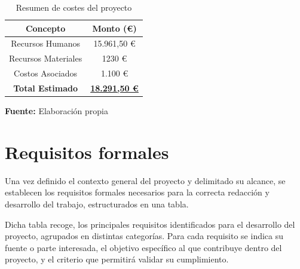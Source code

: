\documentclass[a4paper, 11pt]{article}
\begin{document}
\begin{table}[H]
\caption{Resumen de costes del proyecto}
\centering
\renewcommand{\arraystretch}{1.5}
\begin{tabular}{|c|c|}
\hline
\textbf{Concepto} & \textbf{Monto (€)} \\ \hline
Recursos Humanos & 15.961,50 € \\ \hline
Recursos Materiales & 1230 € \\ \hline
Costos Asociados & 1.100 € \\ \hline
\textbf{Total Estimado} & \underline{\textbf{18.291,50 €}} \\ \hline
\end{tabular}
\begin{flushleft}\centering
    \footnotesize \textbf{Fuente:} Elaboración propia
\end{flushleft}   
\label{tab:resumen_costes}
\end{table}



\clearpage
\thispagestyle{nohead}












\section{Requisitos formales}
\par\vspace{0.5cm}
Una vez definido el contexto general del proyecto y delimitado su alcance, se establecen los requisitos formales necesarios para la correcta redacción y desarrollo del trabajo, estructurados en una tabla.
\par\vspace{0.5cm}

Dicha tabla recoge, los principales requisitos identificados para el desarrollo del proyecto, agrupados en distintas categorías. Para cada requisito se indica su fuente 
o parte interesada, el objetivo específico al que contribuye dentro del proyecto, y el criterio que permitirá validar su cumplimiento.
\end{document}
